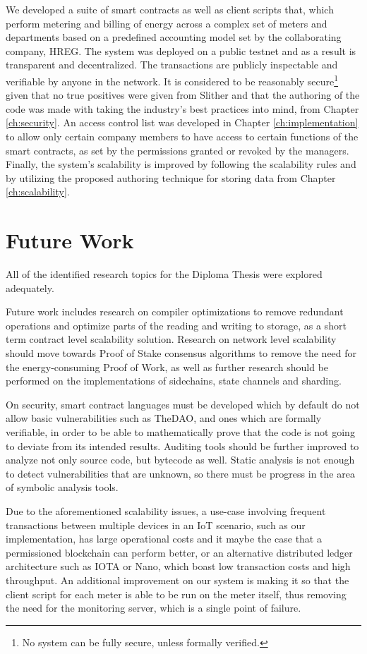 We developed a suite of smart contracts as well as client scripts that, which perform metering and billing of energy across a complex set of meters and departments based on a predefined accounting model set by the collaborating company, HREG. The system was deployed on a public testnet and as a result is transparent and decentralized. The transactions are publicly inspectable and verifiable by anyone in the network. It is considered to be reasonably secure\footnote{No system can be fully secure, unless formally verified.} given that no true positives were given from Slither and that the authoring of the code was made with taking the industry's best practices into mind, from Chapter \ref{ch:security}. An access control list was developed in Chapter \ref{ch:implementation} to allow only certain company members to have access to certain functions of the smart contracts, as set by the permissions granted or revoked by the managers. Finally, the system's scalability is improved by following the scalability rules and by utilizing the proposed authoring technique for storing data from Chapter \ref{ch:scalability}.


\section{Future Work}

All of the identified research topics for the Diploma Thesis were explored adequately. 

Future work includes research on compiler optimizations to remove redundant operations and optimize parts of the reading and writing to storage, as a short term contract level scalability solution. Research on network level scalability should move towards Proof of Stake consensus algorithms to remove the need for the energy-consuming Proof of Work, as well as further research should be performed on the implementations of sidechains, state channels and sharding.

On security, smart contract languages must be developed which by default do not allow basic vulnerabilities such as TheDAO, and ones which are formally verifiable, in order to be able to mathematically prove that the code is not going to deviate from its intended results. Auditing tools should be further improved to analyze not only source code, but bytecode as well. Static analysis is not enough to detect vulnerabilities that are unknown, so there must be progress in the area of symbolic analysis tools.

Due to the aforementioned scalability issues, a use-case involving frequent transactions between multiple devices in an IoT scenario, such as our implementation, has large operational costs and it maybe the case that a permissioned blockchain can perform better, or an alternative distributed ledger architecture such as IOTA or Nano, which boast low transaction costs and high throughput. An additional improvement on our system is making it so that the client script for each meter is able to be run on the meter itself, thus removing the need for the monitoring server, which is a single point of failure.